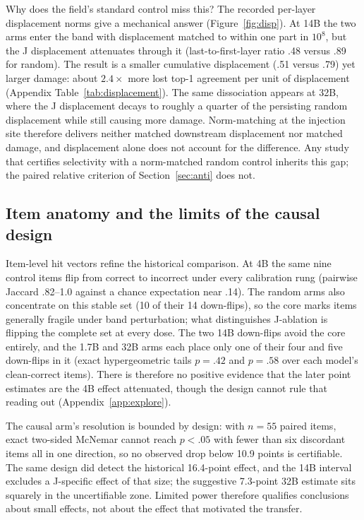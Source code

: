 \documentclass{article}
\begin{document}
Why does the field's standard control miss this? The recorded per-layer displacement
norms give a mechanical answer (Figure~\ref{fig:disp}). At 14B the two arms enter the band
with displacement matched to within one part in $10^{8}$, but the J displacement attenuates
through it (last-to-first-layer ratio .48 versus .89 for random). The result is a smaller
cumulative displacement (.51 versus .79) yet larger damage: about $2.4\times$ more lost
top-1 agreement per unit of displacement (Appendix Table~\ref{tab:displacement}). The
same dissociation appears at 32B, where the J displacement decays to roughly a quarter of
the persisting random displacement while still causing more damage. Norm-matching at the
injection site therefore delivers neither matched downstream displacement nor matched
damage, and displacement alone does not account for the difference. Any study that
certifies selectivity with a norm-matched random control inherits this gap; the paired
relative criterion of Section~\ref{sec:anti} does not.

\subsection{Item anatomy and the limits of the causal design}
\label{sec:limits}

Item-level hit vectors refine the historical comparison. At 4B the same nine control
items flip from correct to incorrect under every calibration rung (pairwise Jaccard
.82--1.0 against a chance expectation near .14). The random arms also concentrate on this
stable set (10 of their 14 down-flips), so the core marks items generally fragile
under band perturbation; what distinguishes J-ablation is flipping the complete set at
every dose. The two 14B down-flips avoid the core entirely, and the 1.7B and 32B arms each place
only one of their four and five down-flips in it (exact hypergeometric tails $p=.42$ and
$p=.58$ over each model's clean-correct items). There is therefore no positive evidence
that the later point estimates are the 4B effect attenuated, though the design cannot
rule that reading out (Appendix~\ref{app:explore}).

The causal arm's resolution is bounded by design: with $n=55$ paired items, exact
two-sided McNemar cannot reach $p<.05$ with fewer than six discordant items all in one
direction, so no observed drop below 10.9 points is certifiable. The same design did
detect the historical 16.4-point effect, and the 14B interval excludes a J-specific
effect of that size; the suggestive 7.3-point 32B estimate sits squarely in the
uncertifiable zone. Limited power therefore qualifies conclusions about small effects,
not about the effect that motivated the transfer.
\end{document}
